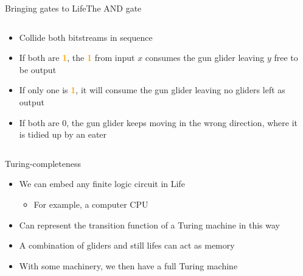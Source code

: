 \documentclass{beamer}
\newcommand{\on}[0]{\textcolor{orange}{\bf 1}\xspace}
\newcommand{\off}[0]{0\xspace}
\begin{document}
\begin{frame}[t]{Bringing gates to Life}{The AND gate}
	\begin{columns}
	\begin{column}{0.5\paperwidth}
		\begin{itemize}
			\item Collide both bitstreams in sequence
			\item If both are \on, the \on from input $x$ consumes the gun glider leaving $y$ free to be output
			\item If only one is \on, it will consume the gun glider leaving no gliders left as output
			\item If both are \off, the gun glider keeps moving in the wrong direction, where it is tidied up by an eater
		\end{itemize}
	\end{column}

	\begin{column}{0.5\paperwidth}
		\begin{center}
		\end{center}
	\end{column}
	\end{columns}
\end{frame}

\begin{frame}{Turing-completeness}
	\begin{itemize}
		\item We can embed any finite logic circuit in Life
			\begin{itemize}
				\item For example, a computer CPU
			\end{itemize}
		\item Can represent the transition function of a Turing machine in this way
		\item A combination of gliders and still lifes can act as memory
		\item With some machinery, we then have a full Turing machine
	\end{itemize}
\end{frame}
\end{document}
